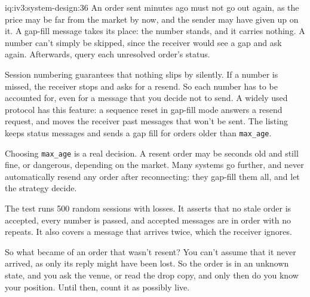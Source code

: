 \begin{solution}{iq:iv3:system-design:36}
An order sent minutes ago must not go out again, as the price may be far from the market by now, and the sender may have given up on it. A gap-fill message takes its place: the number stands, and it carries nothing. A number can't simply be skipped, since the receiver would see a gap and ask again. Afterwards, query each unresolved order's status.
\label{lst:iv3:sd:session}

Session numbering guarantees that nothing slips by silently. If a number is missed, the receiver stops and asks for a resend. So each number has to be accounted for, even for a message that you decide not to send. A widely used protocol has this feature: a sequence reset in gap-fill mode answers a resend request, and moves the receiver past messages that won't be sent. The listing keeps status messages and sends a gap fill for orders older than \texttt{max\_age}.

Choosing \texttt{max\_age} is a real decision. A resent order may be seconds old and still fine, or dangerous, depending on the market. Many systems go further, and never automatically resend any order after reconnecting: they gap-fill them all, and let the strategy decide.

The test runs 500 random sessions with losses. It asserts that no stale order is accepted, every number is passed, and accepted messages are in order with no repeats. It also covers a message that arrives twice, which the receiver ignores.

So what became of an order that wasn't resent? You can't assume that it never arrived, as only its reply might have been lost. So the order is in an unknown state, and you ask the venue, or read the drop copy, and only then do you know your position. Until then, count it as possibly live.

\end{solution}

